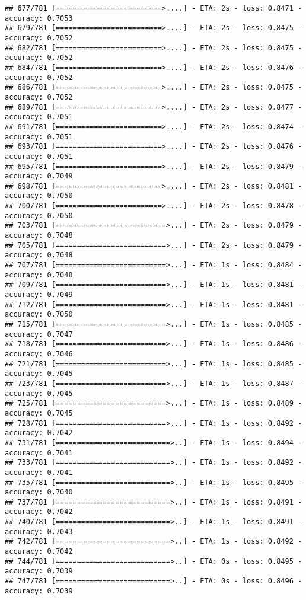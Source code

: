 \documentclass[
]{article}
\begin{document}
\begin{verbatim}
## 677/781 [=========================>....] - ETA: 2s - loss: 0.8471 - accuracy: 0.7053
## 679/781 [=========================>....] - ETA: 2s - loss: 0.8475 - accuracy: 0.7052
## 682/781 [=========================>....] - ETA: 2s - loss: 0.8475 - accuracy: 0.7052
## 684/781 [=========================>....] - ETA: 2s - loss: 0.8476 - accuracy: 0.7052
## 686/781 [=========================>....] - ETA: 2s - loss: 0.8475 - accuracy: 0.7052
## 689/781 [=========================>....] - ETA: 2s - loss: 0.8477 - accuracy: 0.7051
## 691/781 [=========================>....] - ETA: 2s - loss: 0.8474 - accuracy: 0.7051
## 693/781 [=========================>....] - ETA: 2s - loss: 0.8476 - accuracy: 0.7051
## 695/781 [=========================>....] - ETA: 2s - loss: 0.8479 - accuracy: 0.7049
## 698/781 [=========================>....] - ETA: 2s - loss: 0.8481 - accuracy: 0.7050
## 700/781 [=========================>....] - ETA: 2s - loss: 0.8478 - accuracy: 0.7050
## 703/781 [==========================>...] - ETA: 2s - loss: 0.8479 - accuracy: 0.7048
## 705/781 [==========================>...] - ETA: 2s - loss: 0.8479 - accuracy: 0.7048
## 707/781 [==========================>...] - ETA: 1s - loss: 0.8484 - accuracy: 0.7048
## 709/781 [==========================>...] - ETA: 1s - loss: 0.8481 - accuracy: 0.7049
## 712/781 [==========================>...] - ETA: 1s - loss: 0.8481 - accuracy: 0.7050
## 715/781 [==========================>...] - ETA: 1s - loss: 0.8485 - accuracy: 0.7047
## 718/781 [==========================>...] - ETA: 1s - loss: 0.8486 - accuracy: 0.7046
## 721/781 [==========================>...] - ETA: 1s - loss: 0.8485 - accuracy: 0.7045
## 723/781 [==========================>...] - ETA: 1s - loss: 0.8487 - accuracy: 0.7045
## 725/781 [==========================>...] - ETA: 1s - loss: 0.8489 - accuracy: 0.7045
## 728/781 [==========================>...] - ETA: 1s - loss: 0.8492 - accuracy: 0.7042
## 731/781 [===========================>..] - ETA: 1s - loss: 0.8494 - accuracy: 0.7041
## 733/781 [===========================>..] - ETA: 1s - loss: 0.8492 - accuracy: 0.7041
## 735/781 [===========================>..] - ETA: 1s - loss: 0.8495 - accuracy: 0.7040
## 737/781 [===========================>..] - ETA: 1s - loss: 0.8491 - accuracy: 0.7042
## 740/781 [===========================>..] - ETA: 1s - loss: 0.8491 - accuracy: 0.7043
## 742/781 [===========================>..] - ETA: 1s - loss: 0.8492 - accuracy: 0.7042
## 744/781 [===========================>..] - ETA: 0s - loss: 0.8495 - accuracy: 0.7039
## 747/781 [===========================>..] - ETA: 0s - loss: 0.8496 - accuracy: 0.7039

\end{verbatim}
\end{document}
